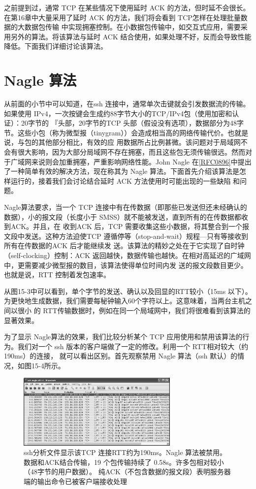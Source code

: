 之前提到过，通常 TCP 在某些情况下使用延时 ACK 的方法，但时延不会很长。在第16章中大量采用了延时 ACK 的方法，我们将会看到 TCP怎样在处理批量数据的大数据包传输
中实现拥塞控制。在小数据包传输中，如交互式应用，需要采用另外的算法。将该算法与延时 ACK 结合使用，如果处理不好，反而会导致性能降低。下面我们详细讨论该算法。

\section{Nagle 算法}
从前面的小节中可以知道，在ssh 连接中，通常单次击键就会引发数据流的传输。如果使用 IPv4，一次按键会生成约88字节大小的TCP/IPv4包（使用加密和认证）：20字节的
『头部，20字节的TCP 头部（假设没有选项），数据部分为48字节。这些小包（称为微型报（tinygram））会造成相当高的网络传输代价。也就是说，与包的其他部分相比，有效的应
用数据所占比例甚微。该问题对于局域网不会有很大影响，因为大部分局域网不存在拥塞，而且这些包无须传输很远。然而对于广域网来说则会加重拥塞，严重影响网络性能。John
Nagle 在\href{https://www.rfc-editor.org/rfc/rfc0896}{[RFC0896]}中提出了一种简单有效的解决方法，现在称其为 Nagle 算法。下面首先介绍该算法是怎样运行的，接着我们会讨论结合延时 ACK 方法使用时可能出现的一些缺陷
和问题。

Nagle算法要求，当一个 TCP 连接中有在传数据（即那些已发送但还未经确认的数据），小的报文段（长度小于 SMSS）就不能被发送，直到所有的在传数据都收到ACK。并且，在
收到ACK 后，TCP 需要收集这些小数据，将其整合到一个报文段中发送。这种方法迫使TCP 遵循停等（stop-and-wait）规程—只有等接收到所有在传数据的ACK 后才能继续发
送。该算法的精妙之处在于它实现了自时钟（self-clocking）控制：ACK 返回越快，数据传输也越快。在相对高延迟的广域网中，更需要减少微型报的数目，该算法使得单位时间内发
送的报文段数目更少。也就是说，RTT 控制着发包速率。

从图15-3中可以看到，单个字节的发送、确认以及回显的RTT较小（15ms 以下）。为更快地生成数据，我们需要每秘钟输入60个字符以上。这意味着，当两台主机之间以很小
的 RTT传输数据时，例如在同一个局域网中，我们将很难看到该算法的显著效果。

为了显示 Nagle算法的效果，我们比较分析某个 TCP 应用使用和禁用该算法的行为。我们对一个 ssh 版本的客户端做了一定的修改。利用一个 RTT相对较大（约190ms）的连接，
就可以看出区别。首先观察禁用 Nagle 算法（ssh 默认）的情况，如图15-4所示。
\begin{figure}[!htb]
    \centering
	\includegraphics[width=0.7\textwidth]{imgs/15/15-4.png}
	\caption{ssh分析文件显示该TCP 连接RTT约为190ms。Nagle 算法被禁用。数据和ACK结合传输，19 个包传输持续了 0.58s。许多包相对较小（48字节的用户数据）。
    纯ACK（不包含数据的报文段）表明服务器端的输出命令已被客户端接收处理}
\end{figure}

